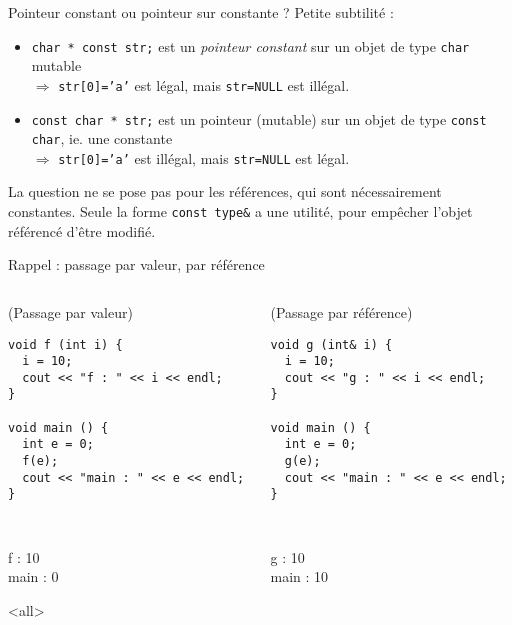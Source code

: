\documentclass[c]{beamer}
\newcommand{\inline}[1]{\texttt{#1}}
\begin{document}
\begin{frame}[fragile]{Pointeur constant ou pointeur sur constante ?}
Petite subtilité :
\begin{itemize}
  \item \inline{char * const str;} est un \textit{pointeur constant} sur un objet de type \inline{char} mutable\\
  $\Rightarrow$ \inline{str[0]='a'} est légal, mais \inline{str=NULL} est illégal.
  \item \inline{const char * str;} est un pointeur (mutable) sur un objet de type \inline{const char}, ie. une constante\\
  $\Rightarrow$ \inline{str[0]='a'} est illégal, mais \inline{str=NULL} est légal.
\end{itemize}
\vspace{1em}
\pause
La question ne se pose pas pour les références, qui sont nécessairement constantes. Seule la forme \inline{const type&} a une utilité, pour empêcher l'objet référencé d'être modifié.
\end{frame}


\begin{frame}[fragile]{Rappel : passage par valeur, par référence}
 \begin{columns}
\begin{column}{0.5\columnwidth}
\begin{cbox}[][lwuc][\footnotesize](Passage par valeur)
\begin{verbatim}
void f (int i) {
  i = 10;
  cout << "f : " << i << endl;
}

void main () {
  int e = 0;
  f(e);
  cout << "main : " << e << endl;
}
\end{verbatim}

\tt
\begin{cbox}
f : 10\\
main : 0
\end{cbox}

\onslide<all>
\end{cbox}
\end{column}
\begin{column}{0.5\columnwidth}
\begin{cbox}[][lwuc][\footnotesize](Passage par référence)
\begin{verbatim}
void g (int& i) {
  i = 10;
  cout << "g : " << i << endl;
}

void main () {
  int e = 0;
  g(e);
  cout << "main : " << e << endl;
}
\end{verbatim}

\tt
\begin{cbox}
g : 10\\
main : 10
\end{cbox}
\end{cbox}
\end{column}
\end{columns}
\end{frame}
\end{document}
